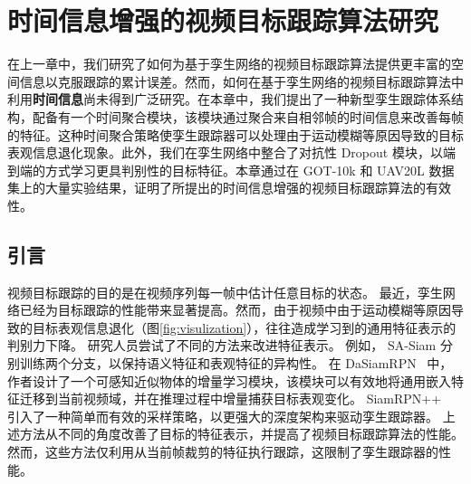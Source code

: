 \chapter{时间信息增强的视频目标跟踪算法研究}\label{chap:end}
在上一章中，我们研究了如何为基于孪生网络的视频目标跟踪算法提供更丰富的空间信息以克服跟踪的累计误差。然而，如何在基于孪生网络的视频目标跟踪算法中利用\textbf{时间信息}尚未得到广泛研究。在本章中，我们提出了一种新型孪生跟踪体系结构，配备有一个时间聚合模块，该模块通过聚合来自相邻帧的时间信息来改善每帧的特征。这种时间聚合策略使孪生跟踪器可以处理由于运动模糊等原因导致的目标表观信息退化现象。此外，我们在孪生网络中整合了对抗性 Dropout 模块，以端到端的方式学习更具判别性的目标特征。本章通过在 GOT-10k \cite{GOT-10k} 和 UAV20L \cite{mueller2016benchmark} 数据集上的大量实验结果，证明了所提出的时间信息增强的视频目标跟踪算法的有效性。

\section{引言}
\label{sec:intro}
视频目标跟踪的目的是在视频序列每一帧中估计任意目标的状态。 
最近，孪生网络已经为目标跟踪的性能带来显著提高。然而，由于视频中由于运动模糊等原因导致的目标表观信息退化（图\ref{fig:visulization}），往往造成学习到的通用特征表示的判别力下降。
研究人员尝试了不同的方法来改进特征表示。
例如，
SA-Siam \cite{he2018twofold} 分别训练两个分支，以保持语义特征和表观特征的异构性。
在 DaSiamRPN~\cite{zhu2018distractor} 中，作者设计了一个可感知近似物体的增量学习模块，该模块可以有效地将通用嵌入特征迁移到当前视频域，并在推理过程中增量捕获目标表观变化。
SiamRPN++~\cite{SiamRPN++} 引入了一种简单而有效的采样策略，以更强大的深度架构来驱动孪生跟踪器。
上述方法从不同的角度改善了目标的特征表示，并提高了视频目标跟踪算法的性能。
然而，这些方法仅利用从当前帧裁剪的特征执行跟踪，这限制了孪生跟踪器的性能。

